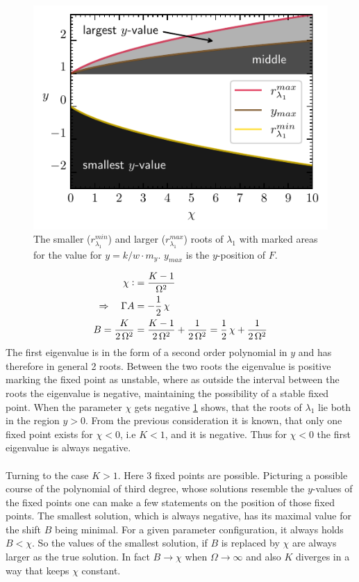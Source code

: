 \documentclass{article}
\begin{document}
\begin{figure}
    \includegraphics{pictures/sign_of_ev1.pdf}
    \vspace*{-2cm}\caption{The smaller ($r_{\lambda_1}^{min}$) and larger ($r_{\lambda_1}^{max}$) roots of $\lambda_1$ with marked areas for the value for ${y}=k/w\cdot m_y$. ${y}_{max}$ is the ${y}$-position of $F$.}
    \label{fig:sign_lam1}
\end{figure}
\begin{align*}
    \chi\vcentcolon&=\frac{K-1}{\Omega^2}\\
    \Rightarrow\quad\Gamma A&=-\frac{1}{2}\,\chi\\
    B=\frac{K}{2\,\Omega^2}&=\frac{K-1}{2\,\Omega^2}+\frac{1}{2\,\Omega^2}=\frac{1}{2}\,\chi+\frac{1}{2\,\Omega^2}
\end{align*}
The first eigenvalue is in the form of a second order polynomial in $y$ and has therefore in general 2 roots. Between the two roots the eigenvalue is positive marking the fixed point as unstable, where as outside the interval between the roots the eigenvalue is negative, maintaining the possibility of a stable fixed point. When the parameter $\chi$ gets negative \ref{fig:sign_lam1} shows, that the roots of $\lambda_1$ lie both in the region $y>0$. From the previous consideration it is known, that only one fixed point exists for $\chi<0$, i.e $K<1$, and it is negative. Thus for $\chi<0$ the first eigenvalue is always negative.\\\\
Turning to the case $K>1$. Here 3 fixed points are possible. Picturing a possible course of the polynomial of third degree, whose solutions resemble the $y$-values of the fixed points one can make a few statements on the position of those fixed points. The smallest solution, which is always negative, has its maximal value for the shift $B$ being minimal. For a given parameter configuration, it always holds $B<\chi$. So the values of the smallest solution, if $B$ is replaced by $\chi$ are always larger as the true solution. In fact $B\rightarrow\chi$ when $\Omega\rightarrow\infty$ and also $K$ diverges in a way that keeps $\chi$ constant.
\end{document}
